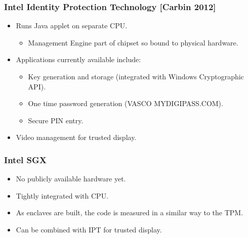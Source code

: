 \documentclass{beamer}
\begin{document}
\begin{frame}
    \frametitle{Intel Identity Protection Technology [Carbin 2012]}

    \begin{itemize}
        \item Runs Java applet on separate CPU.
        \begin{itemize}
            \item Management Engine part of chipset so bound to physical hardware.
        \end{itemize}
        \vfill
        \item Applications currently available include:
        \begin{itemize}
            \item Key generation and storage (integrated with Windows Cryptographic API).
            \item One time password generation (VASCO MYDIGIPASS.COM).
            \item Secure PIN entry.
        \end{itemize}
        \item Video management for trusted display.
    \end{itemize}
\end{frame}

\begin{frame}
    \frametitle{Intel SGX}
    
    \begin{itemize}
        \item No publicly available hardware yet.
        \vfill
        \item Tightly integrated with CPU.
        \vfill
        \item As enclaves are built, the code is measured in a similar way to the TPM.
        \vfill
        \item Can be combined with IPT for trusted display.
    \end{itemize}
\end{frame}
\end{document}
